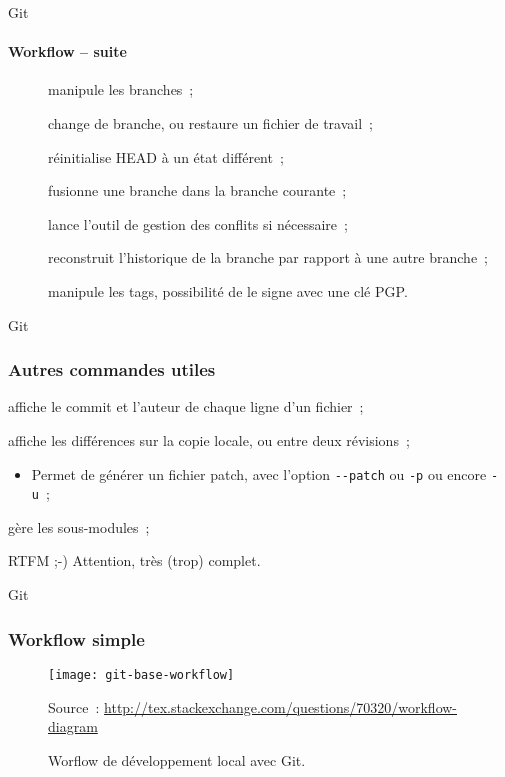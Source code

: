 \begin{frame}{Git}
\framesubtitle{Workflow -- suite}
\begin{description}
 \item [] manipule les branches~;
 \pause
 \item [] change de branche, ou restaure un fichier de travail~;
 \pause
 \item [] réinitialise HEAD à un état différent~;
 \pause
 \item [] fusionne une branche dans la branche courante~;
 \pause
 \item [] lance l'outil de gestion des conflits si nécessaire~;
 \pause
 \item [] reconstruit l'historique de la branche par rapport à une autre branche~;
 \pause
 \item [] manipule les tags, possibilité de le signe avec une clé PGP.
\end{description}
\end{frame}

\begin{frame}[fragile]{Git}
\frametitle{Autres commandes utiles}
\begin{description}
 \pause
 \item [\Q{git blame}] affiche le commit et l'auteur de chaque ligne d'un fichier~;
 \pause
 \item [\Q{git diff}] affiche les différences sur la copie locale, ou entre deux révisions~;
 \begin{itemize}[<+->]
  \item Permet de générer un fichier patch, avec l'option \verb/--patch/ ou \verb/-p/ ou encore \verb/-u/~;
 \end{itemize}
 \pause
 \item [\Q{git submodule}] gère les sous-modules~;
 \pause
 \item [\Q{git help <command>}] RTFM ;-) Attention, très (trop) complet.
\end{description}
\end{frame}

\begin{frame}{Git}
 \frametitle{Workflow simple}
 \begin{figure}
   \caption{Worflow de développement local avec Git.}
   \texttt{[image: git-base-workflow]}\par
   \tiny Source~: \url{http://tex.stackexchange.com/questions/70320/workflow-diagram}
 \end{figure}
\end{frame}

